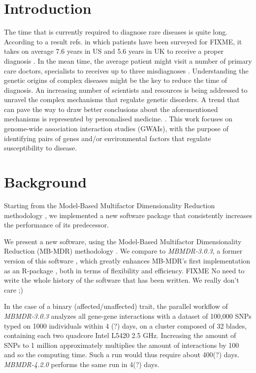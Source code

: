 \documentclass{bmcart}
\begin{document}
\section*{Introduction}
The time that is currently required to diagnose rare diseases is quite long. According to a result refs. in which patients have been surveyed for FIXME, it takes on average 7.6 years in US and 5.6 years in UK to receive a proper diagnosis \cite{Shire2013}. In the mean time, the average patient might visit a number of primary care doctors, specialists to receives up to three misdiagnoses \cite{Shire2013}. Understanding the genetic origins of complex diseases might be the key to reduce the time of diagnosis. An increasing number of scientists and resources is being addressed to unravel the complex mechanisms that regulate genetic disorders.
A trend that can pave the way to draw better conclusions about the aforementioned mechanisms is represented by personalised medicine.   
\cite{Shastry2006, VantVeer2008, Galas2009, Beevers2012, Lester2013}. This work focuses on genome-wide association interaction studies (GWAIs), with the purpose of identifying pairs of genes and/or environmental factors that regulate  susceptibility to disease.

\section*{Background}
Starting from the Model-Based Multifactor Dimensionality Reduction methodology \cite{Calle2008, Calle2008b, Cattaert2011,Mahachie2012}, we implemented a new software package that consistently increases the performance of its predecessor. 



We present a new software, using the Model-Based Multifactor Dimensionality Reduction (MB-MDR) methodology \cite{Calle2008, Calle2008b, Cattaert2011,Mahachie2012}. We compare to {\em MBMDR-3.0.3}, a former version of this software \cite{VanLishout2013}, which greatly enhances MB-MDR's first implementation as an R-package \cite{Calle2010}, both in terms of flexibility and efficiency. 
FIXME No need to write the whole history of the software that has been written. We really don't care ;)


In the case of a binary (affected/unaffected) trait, the parallel workflow of {\em MBMDR-3.0.3} analyzes all gene-gene interactions with a dataset of 100,000 SNPs typed on 1000 individuals within 4 (?) days, on a cluster composed of 32 blades, containing each two quadcore Intel L5420 2.5 GHz. Increasing the amount of SNPs to 1 million approximately multiplies the amount of interactions by 100 and so the computing time. Such a run would thus require about 400(?) days.  {\em MBMDR-4.2.0} performs the same run in 4(?) days.
\end{document}
